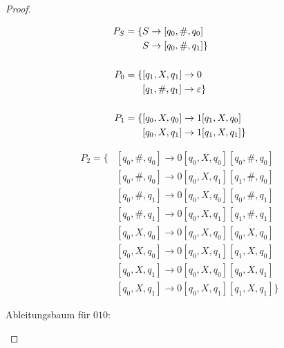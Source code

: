 \begin{proof}
    \begin{center}
    \vspace*{-1.5\baselineskip}
    \begin{minipage}[t]{55mm}
    \begin{align*}
    P_S = \{ 
    & S \to [q_0, \#, q_0]\\
    & S \to [q_0, \#, q_1] 
    \}\\
    \\
    P_0 = \{ 
    & [q_1, X, q_1] \to 0\\
    & [q_1, \#, q_1] \to \varepsilon
    \}\\
    \\
    P_1 = \{ 
    & [q_0, X, q_0] \to 1[q_1, X, q_0]\\
    & [q_0, X, q_1] \to 1[q_1, X, q_1]
    \}
    \end{align*}
    \end{minipage}
    \begin{minipage}[t]{70mm}
    \begin{align*}
    P_2 = \{ 
    & [q_0, \#,q_0] \to 0[q_0, X, q_0] [q_0, \#, q_0]\\
    & [q_0, \#,q_0] \to 0[q_0, X, q_1] [q_1, \#, q_0]\\
    & [q_0, \#,q_1] \to 0[q_0, X, q_0] [q_0, \#, q_1]\\
    & [q_0, \#,q_1] \to 0[q_0, X, q_1] [q_1, \#, q_1]\\
    & [q_0, X,q_0] \to 0[q_0, X, q_0] [q_0, X, q_0]\\
    & [q_0, X,q_0] \to 0[q_0, X, q_1] [q_1, X, q_0]\\
    & [q_0, X,q_1] \to 0[q_0, X, q_0] [q_0, X, q_1]\\
    & [q_0, X,q_1] \to 0[q_0, X, q_1] [q_1, X, q_1]
    \}
    \end{align*}
    \end{minipage}
    \end{center}
    
    Ableitungsbaum für $010$:
    
    \begin{center}
    \vspace*{-\baselineskip}
\end{center}
\end{proof}
